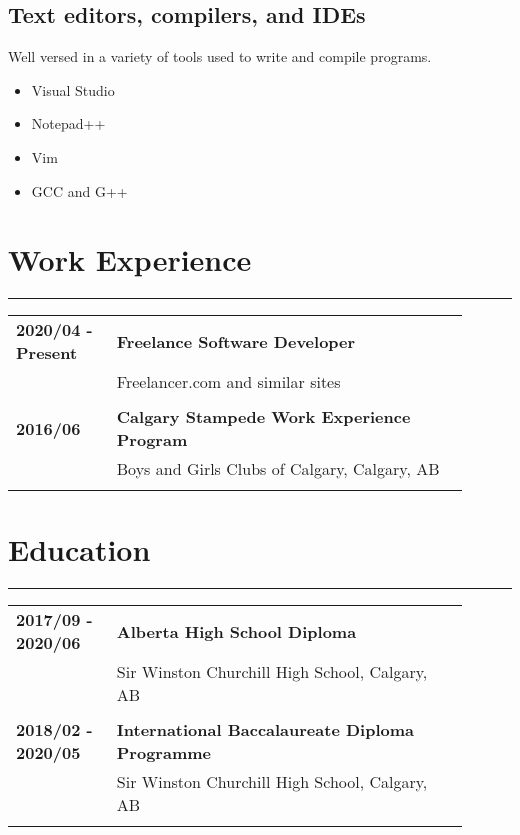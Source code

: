 \documentclass[letterpaper]{article}
\newcommand{\horizontalLine}{%
    \rule{\linewidth}{0.4pt}
    \vspace{1ex}
}
\begin{document}
        \subsection*{Text editors, compilers, and IDEs}
        Well versed in a variety of tools used to write and compile programs.

        \begin{itemize}[itemsep = 0pt]
            \item Visual Studio
            \item Notepad++
            \item Vim
            \item GCC and G++
        \end{itemize}

    \section*{Work Experience}

        \horizontalLine

        \begin{tabular}{p{0.2\linewidth} p{0.7\linewidth}} 
            \textbf{2020/04 - Present} & \large\textbf{Freelance Software Developer} \\
            & Freelancer.com and similar sites \\
            \\
            \textbf{2016/06} & \large\textbf{Calgary Stampede Work Experience Program} \\
            & Boys and Girls Clubs of Calgary, Calgary, AB \\
            \\
        \end{tabular}

    \section*{Education}

        \horizontalLine

        \begin{tabular}{p{0.2\linewidth} p{0.7\linewidth}} 
            \textbf{2017/09 - 2020/06} & \large\textbf{Alberta High School Diploma} \\
            & Sir Winston Churchill High School, Calgary, AB \\
            \\
            \textbf{2018/02 - 2020/05} & \large\textbf{International Baccalaureate Diploma Programme} \\
            & Sir Winston Churchill High School, Calgary, AB \\
            \\
        \end{tabular}
\end{document}
